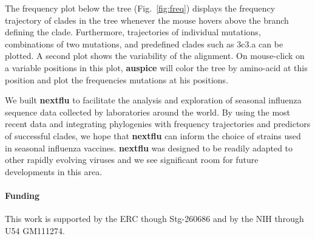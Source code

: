 \documentclass{bioinfo}
\newcommand{\FIG}[1]{Fig.~\ref{fig:#1}}
\newcommand{\auspice}{\textbf{auspice}}
\newcommand{\nextflu}{\textbf{nextflu}}
\begin{document}
The frequency plot below the tree (\FIG{freq}) displays the frequency trajectory of clades in the tree whenever the mouse hovers above the branch defining the clade. Furthermore, trajectories of individual mutations, combinations of two mutations, and predefined clades such as 3c3.a can be plotted. A second plot shows the variability of the alignment. On mouse-click on a variable positions in this plot, \auspice{} will color the tree by amino-acid at this position and plot the frequencies mutations at his positions.

We built \nextflu{} to facilitate the analysis and exploration of seasonal influenza sequence data collected by laboratories around the world.
By using the most recent data and integrating phylogenies with frequency trajectories and predictors of successful clades, we hope that \nextflu{} can inform the choice of strains used in seasonal influenza vaccines. 
\nextflu{} was designed to be readily adapted to other rapidly evolving viruses and we see significant room for future developments in this area.
 
\paragraph{Funding\textcolon}This work is supported by the ERC though Stg-260686 and by the NIH through U54 GM111274.
\end{document}
